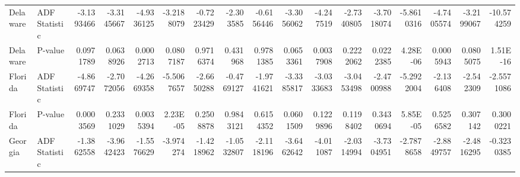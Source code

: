 \begin{table}
{\begin{tabular}{llrrrrrrrrrrrrrrr}
            Delaware    & ADF Statistic & -3.1393466                          & -3.3145667               & -4.9336125               & -3.2188079               & -0.7223429                 & -2.303585                & -0.6156446                 & -3.3056062              & -4.247519               & -2.7340805                 & -3.7018074                 & -5.8610316                & -4.7405574                & -3.2199067                       & -10.574259                       \\
            Delaware    & P-value       & 0.0971789                           & 0.0638926                & 0.0002713                & 0.0807187                & 0.9716374                  & 0.431968                 & 0.9781385                  & 0.0653361               & 0.0037908               & 0.2222062                  & 0.0222385                  & 4.28E-06                  & 0.0005943                 & 0.0805075                        & 1.51E-16                         \\
            Florida     & ADF Statistic & -4.8669747                          & -2.7072056               & -4.2669358               & -5.5067657               & -2.6650288                 & -0.4769127               & -1.9741621                 & -3.3385817              & -3.0333683              & -3.0453498                 & -2.4700988                 & -5.2922004                & -2.136408                 & -2.542309                        & -2.5571086                       \\
            Florida     & P-value       & 0.0003569                           & 0.2331029                & 0.0035394                & 2.23E-05                 & 0.2508878                  & 0.9843121                & 0.6154352                  & 0.0601509               & 0.1229896               & 0.1198402                  & 0.3430694                  & 5.85E-05                  & 0.5256582                 & 0.307142                         & 0.3000221                        \\
            Georgia     & ADF Statistic & -1.3862558                          & -3.9642423               & -1.5576629               & -3.974274                & -1.4218962                 & -1.0532807               & -2.1118196                 & -3.6462642              & -4.011087               & -2.0314994                 & -3.7304951                 & -2.7878658                & -2.8849757                & -2.4816295                       & -0.3230385                       \\

\end{tabular}}
\end{table}
